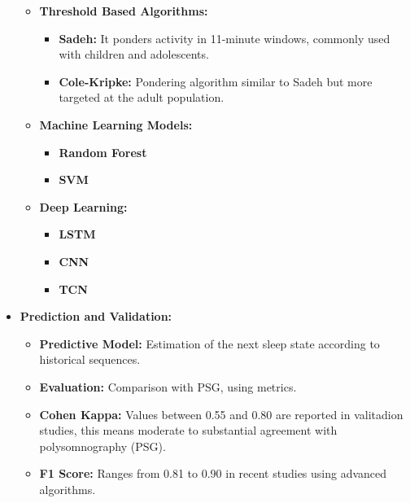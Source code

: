 \documentclass[conference]{IEEEtran}
\begin{document}
\begin{itemize}
            \begin{itemize}
		      \item \textbf{Threshold Based Algorithms:}
                    \begin{itemize}
                        \item \textbf{Sadeh:} It ponders activity in 11-minute windows, commonly used with children and adolescents.
                        \item \textbf{Cole-Kripke:} Pondering algorithm similar to Sadeh but more targeted at the adult population.
                    \end{itemize}
                \item \textbf{Machine Learning Models:}
                     \begin{itemize}
                        \item \textbf{Random Forest} 
                        \item \textbf{SVM} 
                    \end{itemize}
                \item \textbf{Deep Learning:}
                    \begin{itemize}
                        \item \textbf{LSTM} 
                        \item \textbf{CNN}
                        \item \textbf{TCN} 
                    \end{itemize}
	      \end{itemize}
    \item \textbf{Prediction and Validation:}
            \begin{itemize}
		      \item \textbf{Predictive Model:} Estimation of the next sleep state according to historical sequences.
		      \item \textbf{Evaluation:} Comparison with PSG, using metrics.
                \item \textbf{Cohen Kappa:} Values between 0.55 and 0.80 are reported in valitadion studies, this means moderate to substantial agreement with polysomnography (PSG). 
                \item \textbf{F1 Score:} Ranges from 0.81 to 0.90 in recent studies using advanced algorithms.
	      \end{itemize}
    
\end{itemize}
\end{document}
